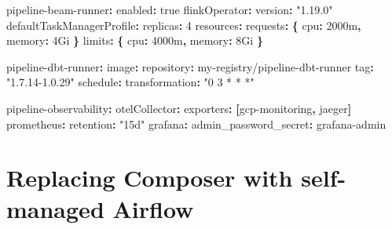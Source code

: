 \documentclass[
  11pt,
  british,
  oneside]{book}
\newenvironment{Shaded}{\begin{snugshade}}{\end{snugshade}}
\newcommand{\AttributeTok}[1]{\textcolor[rgb]{0.77,0.63,0.00}{#1}}
\newcommand{\CharTok}[1]{\textcolor[rgb]{0.31,0.60,0.02}{#1}}
\newcommand{\DecValTok}[1]{\textcolor[rgb]{0.00,0.00,0.81}{#1}}
\newcommand{\FunctionTok}[1]{\textcolor[rgb]{0.00,0.00,0.00}{#1}}
\newcommand{\KeywordTok}[1]{\textcolor[rgb]{0.13,0.29,0.53}{\textbf{#1}}}
\newcommand{\StringTok}[1]{\textcolor[rgb]{0.31,0.60,0.02}{#1}}
\begin{document}
\begin{Shaded}
\begin{Highlighting}[]
\FunctionTok{pipeline{-}beam{-}runner}\KeywordTok{:}
\AttributeTok{  }\FunctionTok{enabled}\KeywordTok{:}\AttributeTok{ }\CharTok{true}
\AttributeTok{  }\FunctionTok{flinkOperator}\KeywordTok{:}
\AttributeTok{    }\FunctionTok{version}\KeywordTok{:}\AttributeTok{ }\StringTok{"1.19.0"}
\AttributeTok{  }\FunctionTok{defaultTaskManagerProfile}\KeywordTok{:}
\AttributeTok{    }\FunctionTok{replicas}\KeywordTok{:}\AttributeTok{ }\DecValTok{4}
\AttributeTok{    }\FunctionTok{resources}\KeywordTok{:}
\AttributeTok{      }\FunctionTok{requests}\KeywordTok{:}\AttributeTok{ }\KeywordTok{\{}\AttributeTok{ }\FunctionTok{cpu}\KeywordTok{:}\AttributeTok{ 2000m}\KeywordTok{,}\AttributeTok{ }\FunctionTok{memory}\KeywordTok{:}\AttributeTok{ 4Gi }\KeywordTok{\}}
\AttributeTok{      }\FunctionTok{limits}\KeywordTok{:}\AttributeTok{   }\KeywordTok{\{}\AttributeTok{ }\FunctionTok{cpu}\KeywordTok{:}\AttributeTok{ 4000m}\KeywordTok{,}\AttributeTok{ }\FunctionTok{memory}\KeywordTok{:}\AttributeTok{ 8Gi }\KeywordTok{\}}

\FunctionTok{pipeline{-}dbt{-}runner}\KeywordTok{:}
\AttributeTok{  }\FunctionTok{image}\KeywordTok{:}
\AttributeTok{    }\FunctionTok{repository}\KeywordTok{:}\AttributeTok{ my{-}registry/pipeline{-}dbt{-}runner}
\AttributeTok{    }\FunctionTok{tag}\KeywordTok{:}\AttributeTok{ }\StringTok{"1.7.14{-}1.0.29"}
\AttributeTok{  }\FunctionTok{schedule}\KeywordTok{:}
\AttributeTok{    }\FunctionTok{transformation}\KeywordTok{:}\AttributeTok{ }\StringTok{"0 3 * * *"}

\FunctionTok{pipeline{-}observability}\KeywordTok{:}
\AttributeTok{  }\FunctionTok{otelCollector}\KeywordTok{:}
\AttributeTok{    }\FunctionTok{exporters}\KeywordTok{:}\AttributeTok{ }\KeywordTok{[}\AttributeTok{gcp{-}monitoring}\KeywordTok{,}\AttributeTok{ jaeger}\KeywordTok{]}
\AttributeTok{  }\FunctionTok{prometheus}\KeywordTok{:}
\AttributeTok{    }\FunctionTok{retention}\KeywordTok{:}\AttributeTok{ }\StringTok{"15d"}
\AttributeTok{  }\FunctionTok{grafana}\KeywordTok{:}
\AttributeTok{    }\FunctionTok{admin\_password\_secret}\KeywordTok{:}\AttributeTok{ grafana{-}admin}
\end{Highlighting}
\end{Shaded}

\hypertarget{replacing-composer-with-self-managed-airflow}{%
\section{Replacing Composer with self-managed
Airflow}\label{replacing-composer-with-self-managed-airflow}}
\end{document}
